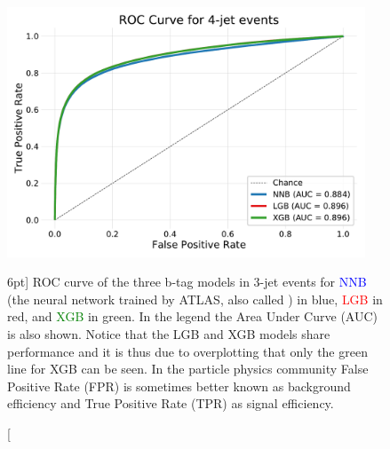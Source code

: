 \documentclass[a4paper, twoside]{tufte-book}
\newcommand{\code}[1]{\colorbox{light-gray}{\texttt{\detokenize{#1}}}}
\begin{document}
\begin{figure}
  \includegraphics[width=0.95\textwidth, trim=10 10 10 40, clip]{figures/quarks/ROC_4_jet-down_sample=1.00-ML_vars=vertex-selection=b-ejet_min=4-n_iter_RS_lgb=99-n_iter_RS_xgb=9-cdot_cut=0.90-version=19.pdf}
  \caption[ROC curve for b-tag in 4-jet events][6pt]
          {ROC curve of the three b-tag models in 3-jet events for \textcolor{blue}{NNB} (the neural network trained by ATLAS, also called \code{nnbjet}) in blue, \textcolor{red}{LGB} in red, and \textcolor{green}{XGB} in green. In the legend the Area Under Curve (AUC) is also shown. Notice that the LGB and XGB models share performance and it is thus due to overplotting that only the green line for XGB can be seen. In the particle physics community False Positive Rate (FPR) is sometimes better known as background efficiency and True Positive Rate (TPR) as signal efficiency.  
          } 
  \label{fig:q:roc_btag_4j}
\end{figure}
\end{document}
